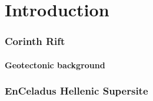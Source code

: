 \graphicspath{{Chapter1/Figs/}}

\section{Introduction}

\begin{frame}
  \frametitle{Corinth Rift}
  \framesubtitle{Geotectonic background}
  \label{}

\end{frame}
\note{}

\begin{frame}
  \frametitle{EnCeladus Hellenic Supersite}
  \framesubtitle{}
  \label{}

\end{frame}
\note{}

